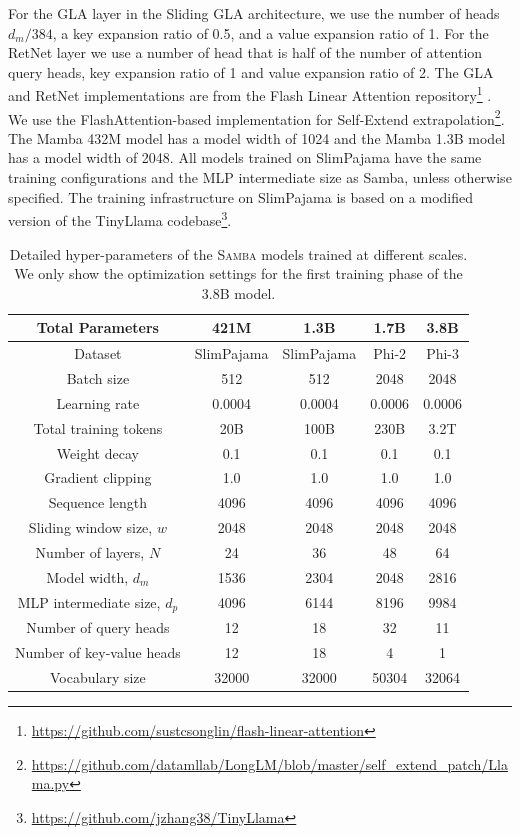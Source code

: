 \documentclass{article}
\begin{document}
For the GLA layer in the Sliding GLA architecture, we use the number of heads $d_m / 384 $, a key expansion ratio of 0.5, and a value expansion ratio of 1. For the RetNet layer we use a number of head that is half of the number of attention query heads, key expansion ratio of 1 and value expansion ratio of 2. The GLA and RetNet implementations are from the Flash Linear Attention \citep{yang2024fla} repository\footnote{\url{https://github.com/sustcsonglin/flash-linear-attention}} . We use the FlashAttention-based implementation for Self-Extend extrapolation\footnote{\url{https://github.com/datamllab/LongLM/blob/master/self_extend_patch/Llama.py}}. The Mamba 432M model has a model width of 1024 and the Mamba 1.3B model has a model width of 2048. All models trained on SlimPajama have the same training configurations and the MLP intermediate size as Samba, unless otherwise specified. The training infrastructure on SlimPajama is based on a modified version of the TinyLlama codebase\footnote{\url{https://github.com/jzhang38/TinyLlama}}.



\begin{table}[!htp]
\centering
\small
\caption{Detailed hyper-parameters of the \textsc{Samba} models trained at different scales. We only show the optimization settings for the first training phase of the 3.8B model.}

\begin{tabular}{ccccc}
\toprule
\textbf{Total Parameters} & \textbf{421M} & \textbf{1.3B} & \textbf{1.7B } & \bf 3.8B \\
\midrule
Dataset & SlimPajama  & SlimPajama & Phi-2 & Phi-3\\
Batch size & 512 & 512 & 2048 & 2048\\
Learning rate & 0.0004 & 0.0004 &  0.0006 & 0.0006 \\
Total training tokens &  20B & 100B  & 230B & 3.2T \\
Weight decay & 0.1 & 0.1 & 0.1 & 0.1 \\
Gradient clipping & 1.0 & 1.0 & 1.0 & 1.0\\
Sequence length & 4096 & 4096 & 4096 & 4096 \\
\midrule
Sliding window size, $w$ & 2048 & 2048 & 2048 & 2048\\
Number of layers, $N$ & 24 & 36 & 48 & 64 \\
Model width, $d_m$ & 1536 & 2304 & 2048 & 2816\\
MLP intermediate size, $d_{p}$ & 4096 & 6144 & 8196 & 9984\\
Number of query heads & 12 & 18 & 32 & 11\\
Number of key-value heads & 12  &  18 & 4 & 1\\
Vocabulary size & 32000 & 32000 & 50304 & 32064\\
\bottomrule
\end{tabular}\label{hype}
\end{table}
\end{document}
